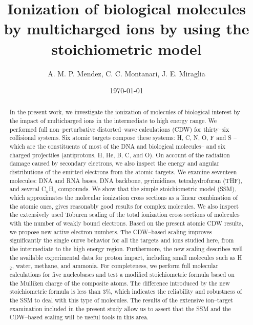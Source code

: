 \documentclass[preprint,showpacs]{revtex4}
\begin{document}
\title{Ionization of biological molecules by multicharged ions by using 
the stoichiometric model}

\author{A. M. P. Mendez, C. C. Montanari, J. E. Miraglia}
\address{Instituto de Astronom\'{\i}a y F\'{\i}sica del Espacio 
(CONICET--UBA), \\ Buenos Aires, Argentina.}

\date{\today}%

\begin{abstract}
In the present work, we investigate the ionization of molecules of 
biological interest by the impact of multicharged ions in the 
intermediate to high energy range. We performed full non--perturbative 
distorted--wave calculations (CDW) for thirty--six collisional systems. 
Six atomic targets compose these systems: H, C, N, O, F and S --which 
are the constituents of most of the DNA and biological molecules-- and 
six charged projectiles (antiprotons, H, He, B, C, and O). On account 
of the radiation damage caused by secondary electrons, we also inspect 
the energy and angular distributions of the emitted electrons from the 
atomic targets. We examine seventeen molecules: DNA and RNA bases, 
DNA backbone, pyrimidines, tetrahydrofuran (THF), and several 
C$_n$H$_n$ compounds. We show that the simple stoichiometric model 
(SSM), which approximates the molecular ionization cross sections as a 
linear combination of the atomic ones, gives reasonably good results 
for complex molecules. We also inspect the extensively used Toburen 
scaling of the total ionization cross sections of molecules with the 
number of weakly bound electrons. Based on the present atomic CDW 
results, we propose new active electron numbers. The CDW--based scaling 
improves significantly the single curve behavior for all the targets 
and ions studied here, from the intermediate to the high energy region. 
Furthermore, the new scaling describes well the available experimental 
data for proton impact, including small molecules such as H$_2$, water, 
methane, and ammonia. For completeness, we perform full molecular 
calculations for five nucleobases and test a modified stoichiometric 
formula based on the Mulliken charge of the composite atoms. The 
difference introduced by the new stoichiometric formula is less than 
$3\%$, which indicates the reliability and robustness of the SSM to 
deal with this type of molecules. The results of the extensive 
ion--target examination included in the present study allow us to 
assert that the SSM and the CDW--based scaling will be useful tools in 
this area.
\end{abstract}
\end{document}
